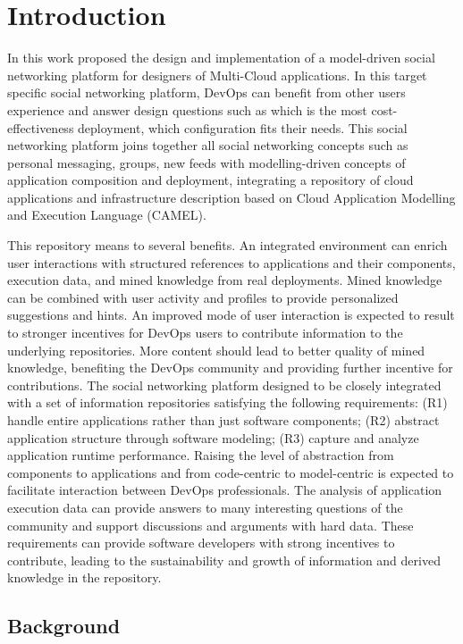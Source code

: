 \chapter{Introduction}
In this work proposed the design and implementation of a model-driven social networking platform for designers of Multi-Cloud applications. In this target specific social networking platform, DevOps can benefit from other users experience and answer design questions such as which is the most cost-effectiveness deployment, which configuration fits their needs. This social networking platform joins together all social networking concepts such as personal messaging, groups, new feeds with modelling-driven concepts of application composition and deployment, integrating a repository of cloud applications and infrastructure description based on Cloud Application Modelling and Execution Language (CAMEL). 

This repository means to several benefits. 
An integrated environment can enrich user interactions with structured references to applications and their components, execution data, and mined knowledge from real deployments. Mined knowledge can be combined with user activity and profiles to provide personalized suggestions and hints.  An improved mode of user interaction is expected to result to stronger incentives for DevOps users to contribute information to the underlying repositories. More content should lead to better quality of mined knowledge, benefiting the DevOps community and providing further incentive for contributions.  The social networking platform designed to be closely integrated with a set of information repositories satisfying the following requirements: 
(R1) handle entire applications rather than just software components; (R2) abstract application structure through software modeling; (R3) capture and analyze application runtime performance. Raising the level of abstraction from components to applications and from code-centric to model-centric is expected to facilitate interaction between DevOps professionals. The analysis of application execution data can provide answers to many interesting questions of the community and
support discussions and arguments with hard data. 
These requirements can provide software developers with strong incentives to contribute, leading to the sustainability and growth of information and derived knowledge in the repository.


\section{Background}


